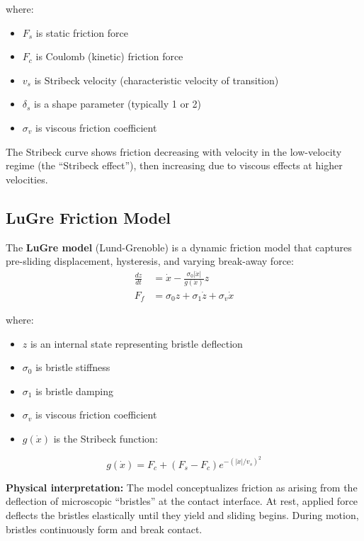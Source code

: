 where:
\begin{itemize}
    \item $F_s$ is static friction force
    \item $F_c$ is Coulomb (kinetic) friction force
    \item $v_s$ is Stribeck velocity (characteristic velocity of transition)
    \item $\delta_s$ is a shape parameter (typically 1 or 2)
    \item $\sigma_v$ is viscous friction coefficient
\end{itemize}

The Stribeck curve shows friction decreasing with velocity in the low-velocity regime (the ``Stribeck effect''), then increasing due to viscous effects at higher velocities.

\subsection{LuGre Friction Model}

The \textbf{LuGre model} (Lund-Grenoble) is a dynamic friction model that captures pre-sliding displacement, hysteresis, and varying break-away force:
\begin{align}
\frac{dz}{dt} &= \dot{x} - \frac{\sigma_0 |\dot{x}|}{g(\dot{x})}z \label{eq:lugre_z} \\
F_f &= \sigma_0 z + \sigma_1 \dot{z} + \sigma_v \dot{x} \label{eq:lugre_f}
\end{align}

where:
\begin{itemize}
    \item $z$ is an internal state representing bristle deflection
    \item $\sigma_0$ is bristle stiffness
    \item $\sigma_1$ is bristle damping
    \item $\sigma_v$ is viscous friction coefficient
    \item $g(\dot{x})$ is the Stribeck function:
\end{itemize}
\begin{equation}
g(\dot{x}) = F_c + (F_s - F_c)e^{-(|\dot{x}|/v_s)^2}
\label{eq:lugre_g}
\end{equation}

\textbf{Physical interpretation:} The model conceptualizes friction as arising from the deflection of microscopic ``bristles'' at the contact interface. At rest, applied force deflects the bristles elastically until they yield and sliding begins. During motion, bristles continuously form and break contact.

